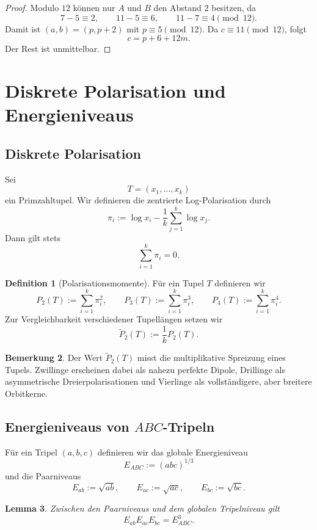 \documentclass[11pt,a4paper]{article}
\theoremstyle{definition}
\newtheorem{definition}{Definition}[section]
\newtheorem{remark}[definition]{Bemerkung}
\theoremstyle{plain}
\newtheorem{lemma}[definition]{Lemma}
\begin{document}
	\begin{proof}
		Modulo $12$ können nur $A$ und $B$ den Abstand $2$ besitzen, da
		\[
		7-5\equiv 2,\qquad 11-5\equiv 6,\qquad 11-7\equiv 4 \pmod{12}.
		\]
		Damit ist $(a,b)=(p,p+2)$ mit $p\equiv 5\pmod{12}$. Da $c\equiv 11\pmod{12}$, folgt
		\[
		c=p+6+12m.
		\]
		Der Rest ist unmittelbar.
	\end{proof}
	
	\section{Diskrete Polarisation und Energieniveaus}
	
	\subsection{Diskrete Polarisation}
	
	Sei
	\[
	T=(x_1,\dots,x_k)
	\]
	ein Primzahltupel. Wir definieren die zentrierte Log-Polarisation durch
	\[
	\pi_i:=\log x_i-\frac{1}{k}\sum_{j=1}^k \log x_j.
	\]
	Dann gilt stets
	\[
	\sum_{i=1}^k \pi_i=0.
	\]
	
	\begin{definition}[Polarisationsmomente]
		Für ein Tupel $T$ definieren wir
		\[
		P_2(T):=\sum_{i=1}^k \pi_i^2,
		\qquad
		P_3(T):=\sum_{i=1}^k \pi_i^3,
		\qquad
		P_4(T):=\sum_{i=1}^k \pi_i^4.
		\]
		Zur Vergleichbarkeit verschiedener Tupellängen setzen wir
		\[
		\widetilde P_2(T):=\frac{1}{k}P_2(T).
		\]
	\end{definition}
	
	\begin{remark}
		Der Wert $\widetilde P_2(T)$ misst die multiplikative Spreizung eines Tupels. Zwillinge erscheinen dabei als nahezu perfekte Dipole, Drillinge als asymmetrische Dreierpolarisationen und Vierlinge als vollständigere, aber breitere Orbitkerne.
	\end{remark}
	
	\subsection{Energieniveaus von $ABC$-Tripeln}
	
	Für ein Tripel $(a,b,c)$ definieren wir das globale Energieniveau
	\[
	E_{ABC}:=(abc)^{1/3}
	\]
	und die Paarniveaus
	\[
	E_{ab}:=\sqrt{ab},\qquad E_{ac}:=\sqrt{ac},\qquad E_{bc}:=\sqrt{bc}.
	\]
	
	\begin{lemma}
		Zwischen den Paarniveaus und dem globalen Tripelniveau gilt
		\[
		E_{ab}E_{ac}E_{bc}=E_{ABC}^3.
		\]
	\end{lemma}
	
\end{document}
